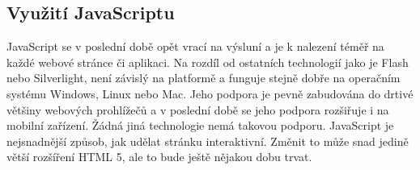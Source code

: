 \subsection{Využití JavaScriptu}

JavaScript se v poslední době opět vrací na výsluní a je k nalezení téměř na každé webové stránce či aplikaci. Na rozdíl od ostatních technologií jako je Flash nebo Silverlight, není závislý na platformě a funguje stejně dobře na operačním systému Windows, Linux nebo Mac. Jeho podpora je pevně zabudována do drtivé většiny webových prohlížečů a v poslední době se jeho podpora rozšiřuje i na mobilní zařízení. Žádná jiná technologie nemá takovou podporu. JavaScript je nejsnadnější způsob, jak udělat stránku interaktivní. Změnit to může snad jedině větší rozšíření HTML 5, ale to bude ještě nějakou dobu trvat.